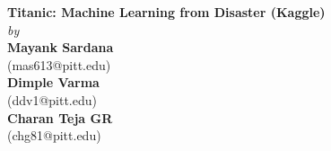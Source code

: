 \documentclass[12pt,a4paper]{article}
\theoremstyle{plain}
\theoremstyle{definition}
\theoremstyle{remark}
\begin{document}

\begin{titlepage}
\enlargethispage{3cm}

\begin{center}

\vspace*{0.5cm}

\textbf{\Large Titanic: Machine Learning from Disaster (Kaggle)}\\[2cm]


{\large \emph{by}}\\[5pt]
{\large\bf {Mayank Sardana}}\\[1pt]
{\large (mas613@pitt.edu)}\\
{\large\bf {Dimple Varma}}\\[1pt]
{\large (ddv1@pitt.edu)}\\
{\large\bf {Charan Teja GR}}\\[1pt]
{\large (chg81@pitt.edu)}\\[2cm]

\end{center}

\end{titlepage}

\clearpage

\newpage




\setcounter{page}{1}

\tableofcontents
\clearpage %
\listoffigures
\clearpage



%










%
%
%
\end{document}
